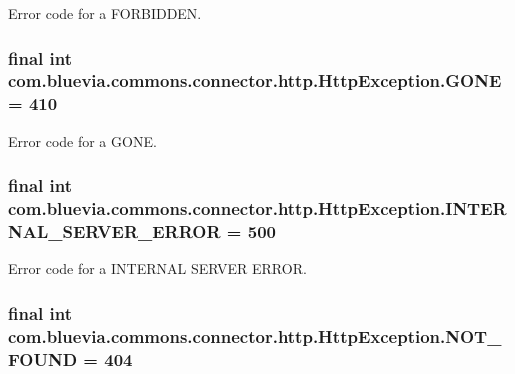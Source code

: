 \label{classcom_1_1bluevia_1_1commons_1_1connector_1_1http_1_1HttpException_aa886f0a05f07ada39b08f71ab03295a3}
Error code for a FORBIDDEN. \hypertarget{classcom_1_1bluevia_1_1commons_1_1connector_1_1http_1_1HttpException_ad597734c6450e38ef231c40202db56c0}{
\subsubsection[{GONE}]{\setlength{\rightskip}{0pt plus 5cm}final int {\bf com.bluevia.commons.connector.http.HttpException.GONE} = 410}}
\label{classcom_1_1bluevia_1_1commons_1_1connector_1_1http_1_1HttpException_ad597734c6450e38ef231c40202db56c0}
Error code for a GONE. \hypertarget{classcom_1_1bluevia_1_1commons_1_1connector_1_1http_1_1HttpException_a71ba76dcf56764f785ae1e0d3287711e}{
\subsubsection[{INTERNAL\_\-SERVER\_\-ERROR}]{\setlength{\rightskip}{0pt plus 5cm}final int {\bf com.bluevia.commons.connector.http.HttpException.INTERNAL\_\-SERVER\_\-ERROR} = 500}}
\label{classcom_1_1bluevia_1_1commons_1_1connector_1_1http_1_1HttpException_a71ba76dcf56764f785ae1e0d3287711e}
Error code for a INTERNAL SERVER ERROR. \hypertarget{classcom_1_1bluevia_1_1commons_1_1connector_1_1http_1_1HttpException_a3a00e30288263a38733c41145867be6d}{
\subsubsection[{NOT\_\-FOUND}]{\setlength{\rightskip}{0pt plus 5cm}final int {\bf com.bluevia.commons.connector.http.HttpException.NOT\_\-FOUND} = 404}}
